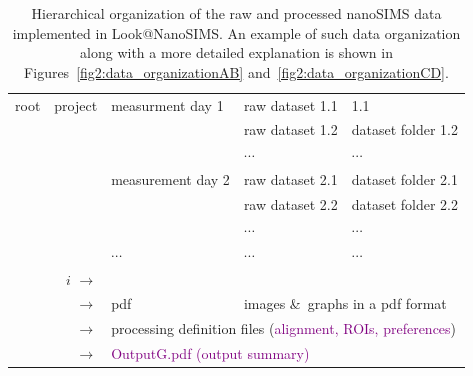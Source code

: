 \documentclass[a4paper, 11pt]{article}
\begin{document}
\begin{table}[!t]
\centering
\caption{\label{tab1:file_structure} Hierarchical organization of the raw and processed nanoSIMS data implemented in Look@NanoSIMS. An example of such data organization along with a more detailed explanation is shown in Figures~\ref{fig2:data_organizationAB} and~\ref{fig2:data_organizationCD}.}
\begin{tabular}{l@{ $\rightarrow$ }c@{ $\rightarrow$ }l@{ $\rightarrow$ }l@{ $\rightarrow$ }l}
\hline
root & project & measurment day 1 & raw dataset 1.1 & \color{red}{dataset folder} 1.1\\
\multicolumn{2}{c}{} & & raw dataset 1.2  & dataset folder 1.2\\
\multicolumn{2}{c}{} & & $\cdots$ & $\cdots$ \\
\multicolumn{1}{c}{} & & measurement day 2 & raw dataset 2.1  & dataset folder 2.1\\
\multicolumn{2}{c}{} & & raw dataset 2.2  & dataset folder 2.2\\
\multicolumn{2}{c}{} & & $\cdots$ & $\cdots$\\
\multicolumn{1}{c}{} & & $\cdots$ & $\cdots$ & $\cdots$\\
\hline
\multicolumn{2}{r}{\color{red}{dataset folder} $i$ $\rightarrow$} & \color{orange}{dat} & \multicolumn{2}{l}{\color{orange}{numbers in a text format}} \\
\multicolumn{2}{r}{$\rightarrow$} & \textcolor{darkgold}{pdf} & \multicolumn{2}{l}{\textcolor{darkgold}{images \&\ graphs in a pdf format}} \\
\multicolumn{2}{r}{$\rightarrow$} & \multicolumn{3}{l}{\hspace{-2mm}processing definition files (\textcolor{purple}{alignment, ROIs, preferences})} \\
\multicolumn{2}{r}{$\rightarrow$} & \multicolumn{3}{l}{\hspace{-2mm}\textcolor{purple}{OutputG.pdf (output summary)}}\\
\hline
\end{tabular}
\end{table}
\end{document}
